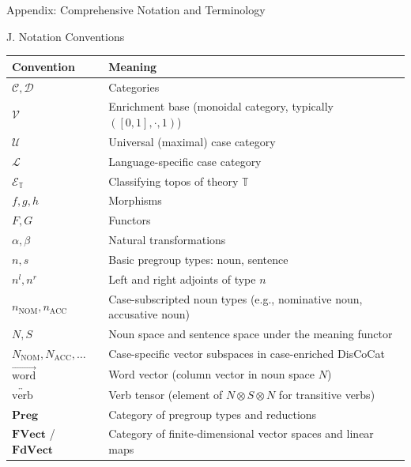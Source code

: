 \documentclass[
  ignorenonframetext,
]{beamer}
\newcounter{none} %
\begin{document}
\begin{frame}[fragile]{Appendix: Comprehensive Notation and Terminology}
\begin{block}{J. Notation Conventions}
\protect{}\label{j.-notation-conventions}
{\def\LTcaptype{none} %
\begin{longtable}[]{@{}
  >{\raggedright\arraybackslash}p{}
  >{\raggedright\arraybackslash}p{}@{}}
\toprule\noalign{}
\begin{minipage}[b]{\linewidth}\raggedright
Convention
\end{minipage} & \begin{minipage}[b]{\linewidth}\raggedright
Meaning
\end{minipage} \\
\midrule\noalign{}
\endhead
\(\mathcal{C}, \mathcal{D}\) & Categories \\
\(\mathcal{V}\) & Enrichment base (monoidal category, typically
\(([0,1], \cdot, 1)\)) \\
\(\mathcal{U}\) & Universal (maximal) case category \\
\(\mathcal{L}\) & Language-specific case category \\
\(\mathcal{E}_{\mathbb{T}}\) & Classifying topos of theory
\(\mathbb{T}\) \\
\(f, g, h\) & Morphisms \\
\(F, G\) & Functors \\
\(\alpha, \beta\) & Natural transformations \\
\(n, s\) & Basic pregroup types: noun, sentence \\
\(n^l, n^r\) & Left and right adjoints of type \(n\) \\
\(n_{\text{NOM}}, n_{\text{ACC}}\) & Case-subscripted noun types (e.g.,
nominative noun, accusative noun) \\
\(N, S\) & Noun space and sentence space under the meaning functor \\
\(N_{\text{NOM}}, N_{\text{ACC}}, \ldots\) & Case-specific vector
subspaces in case-enriched DisCoCat \\
\(\overrightarrow{\text{word}}\) & Word vector (column vector in noun
space \(N\)) \\
\(\overleftrightarrow{\text{verb}}\) & Verb tensor (element of
\(N \otimes S \otimes N\) for transitive verbs) \\
\(\mathbf{Preg}\) & Category of pregroup types and reductions \\
\(\mathbf{FVect}\) / \(\mathbf{FdVect}\) & Category of
finite-dimensional vector spaces and linear maps \\

\end{longtable}}
\end{block}
\end{frame}
\end{document}
